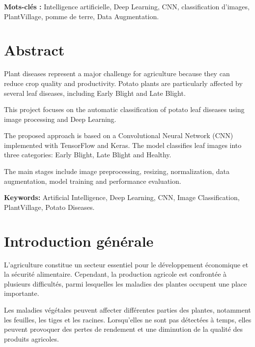 \documentclass[12pt,a4paper,oneside]{report}
\begin{document}
\textbf{Mots-clés :} Intelligence artificielle, Deep Learning,
CNN, classification d'images, PlantVillage, pomme de terre,
Data Augmentation.


\chapter*{Abstract}

Plant diseases represent a major challenge for agriculture
because they can reduce crop quality and productivity.
Potato plants are particularly affected by several leaf diseases,
including Early Blight and Late Blight.

This project focuses on the automatic classification of
potato leaf diseases using image processing and Deep Learning.

The proposed approach is based on a Convolutional Neural
Network (CNN) implemented with TensorFlow and Keras.
The model classifies leaf images into three categories:
Early Blight, Late Blight and Healthy.

The main stages include image preprocessing, resizing,
normalization, data augmentation, model training and
performance evaluation.

\textbf{Keywords:} Artificial Intelligence, Deep Learning,
CNN, Image Classification, PlantVillage, Potato Diseases.


\tableofcontents
\listoffigures
\listoftables

\clearpage
{}


\chapter*{Introduction générale}

L'agriculture constitue un secteur essentiel pour le
développement économique et la sécurité alimentaire.
Cependant, la production agricole est confrontée à plusieurs
difficultés, parmi lesquelles les maladies des plantes
occupent une place importante.

Les maladies végétales peuvent affecter différentes parties
des plantes, notamment les feuilles, les tiges et les racines.
Lorsqu'elles ne sont pas détectées à temps, elles peuvent
provoquer des pertes de rendement et une diminution de
la qualité des produits agricoles.
\end{document}

